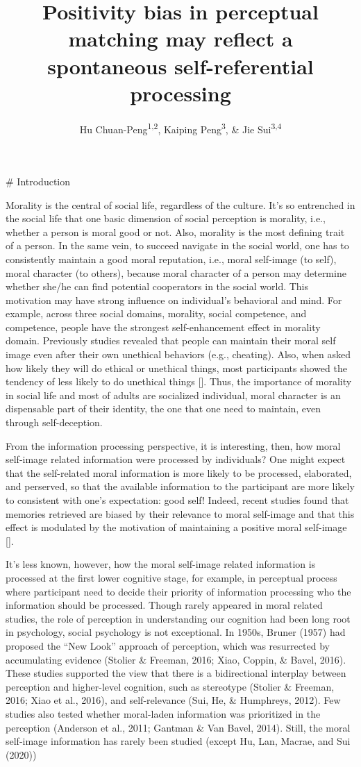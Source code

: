 \documentclass[
  english,
  man]{apa6}
\author{Hu Chuan-Peng\textsuperscript{1,2}, Kaiping Peng\textsuperscript{3}, \& Jie Sui\textsuperscript{3,4}}
\affiliation{
\vspace{0.5cm}
\textsuperscript{1} TBA\\\textsuperscript{2} Leibniz Institute for Resilience Research, 55131 Mainz, Germany\\\textsuperscript{3} Tsinghua University, 100084 Beijing, China\\\textsuperscript{4} University of Aberdeen, Aberdeen, Scotland}
\title{Positivity bias in perceptual matching may reflect a spontaneous self-referential processing}
\date{}
\begin{document}
\maketitle

\# Introduction

Morality is the central of social life, regardless of the culture. It's so entrenched in the social life that one basic dimension of social perception is morality, i.e., whether a person is moral good or not. Also, morality is the most defining trait of a person. In the same vein, to succeed navigate in the social world, one has to consistently maintain a good moral reputation, i.e., moral self-image (to self), moral character (to others), because moral character of a person may determine whether she/he can find potential cooperators in the social world. This motivation may have strong influence on individual's behavioral and mind. For example, across three social domains, morality, social competence, and competence, people have the strongest self-enhancement effect in morality domain. Previously studies revealed that people can maintain their moral self image even after their own unethical behaviors (e.g., cheating). Also, when asked how likely they will do ethical or unethical things, most participants showed the tendency of less likely to do unethical things {[}{]}. Thus, the importance of morality in social life and most of adults are socialized individual, moral character is an dispensable part of their identity, the one that one need to maintain, even through self-deception.

From the information processing perspective, it is interesting, then, how moral self-image related information were processed by individuals? One might expect that the self-related moral information is more likely to be processed, elaborated, and perserved, so that the available information to the participant are more likely to consistent with one's expectation: good self! Indeed, recent studies found that memories retrieved are biased by their relevance to moral self-image and that this effect is modulated by the motivation of maintaining a positive moral self-image {[}{]}.

It's less known, however, how the moral self-image related information is processed at the first lower cognitive stage, for example, in perceptual process where participant need to decide their priority of information processing who the information should be processed. Though rarely appeared in moral related studies, the role of perception in understanding our cognition had been long root in psychology, social psychology is not exceptional. In 1950s, Bruner (1957) had proposed the \enquote{New Look} approach of perception, which was resurrected by accumulating evidence (Stolier \& Freeman, 2016; Xiao, Coppin, \& Bavel, 2016). These studies supported the view that there is a bidirectional interplay between perception and higher-level cognition, such as stereotype (Stolier \& Freeman, 2016; Xiao et al., 2016), and self-relevance (Sui, He, \& Humphreys, 2012). Few studies also tested whether moral-laden information was prioritized in the perception (Anderson et al., 2011; Gantman \& Van Bavel, 2014). Still, the moral self-image information has rarely been studied (except Hu, Lan, Macrae, and Sui (2020))
\end{document}
